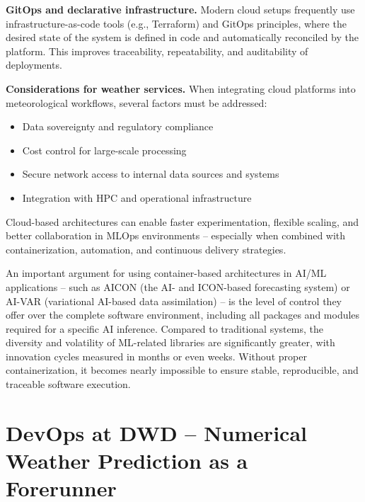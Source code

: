 {\bf GitOps and declarative infrastructure.} Modern cloud setups frequently use infrastructure-as-code tools (e.g., Terraform) and GitOps principles, where the desired state of the system is defined in code and automatically reconciled by the platform. This improves traceability, repeatability, and auditability of deployments.

{\bf Considerations for weather services.} When integrating cloud platforms into meteorological workflows, several factors must be addressed:
\begin{itemize}
	\item Data sovereignty and regulatory compliance
	\item Cost control for large-scale processing
	\item Secure network access to internal data sources and systems
	\item Integration with HPC and operational infrastructure
\end{itemize}

Cloud-based architectures can enable faster experimentation, flexible scaling, and better collaboration in MLOps environments -- especially when combined with containerization, automation, and continuous delivery strategies.

An important argument for using container-based architectures in AI/ML applications -- such as AICON (the AI- and ICON-based forecasting system) or AI-VAR (variational AI-based data assimilation) -- is the level of control they offer over the complete software environment, including all packages and modules required for a specific AI inference. Compared to traditional systems, the diversity and volatility of ML-related libraries are significantly greater, with innovation cycles measured in months or even weeks. Without proper containerization, it becomes nearly impossible to ensure stable, reproducible, and traceable software execution.


%
\section{DevOps at DWD – Numerical Weather Prediction as a Forerunner}

%
